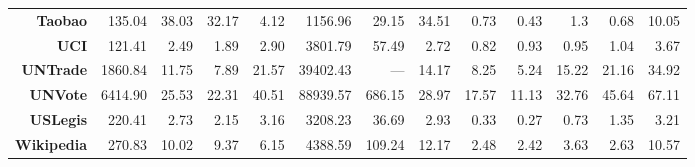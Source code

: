 {\begin{tabular}{@{}r|rrrrrrr|rrrrr@{}}
\textbf{Taobao}                       & 135.04                            & 38.03                              & 32.17                              & 4.12                             & 1156.96                             & 29.15                             & 34.51                             & 0.73                            & 0.43                            & 1.3                             & 0.68                            & 10.05                                    \\
\textbf{UCI}                          & 121.41                            & 2.49                               & 1.89                               & 2.90                             & 3801.79                             & 57.49                             & 2.72                              & 0.82                            & 0.93                            & 0.95                            & 1.04                            & 3.67                                     \\
\textbf{UNTrade}                      & 1860.84                           & 11.75                              & 7.89                               & 21.57                            & 39402.43                            & ---                               & 14.17                             & 8.25                            & 5.24                            & 15.22                           & 21.16                           & 34.92                                    \\
\textbf{UNVote}                       & 6414.90                           & 25.53                              & 22.31                              & 40.51                            & 88939.57                            & 686.15                            & 28.97                             & 17.57                           & 11.13                           & 32.76                           & 45.64                           & 67.11                                    \\
\textbf{USLegis}                      & 220.41                            & 2.73                               & 2.15                               & 3.16                             & 3208.23                             & 36.69                             & 2.93                              & 0.33                            & 0.27                            & 0.73                            & 1.35                            & 3.21                                     \\
\textbf{Wikipedia}                    & 270.83                            & 10.02                              & 9.37                               & 6.15                             & 4388.59                             & 109.24                            & 12.17                             & 2.48                            & 2.42                            & 3.63                            & 2.63                            & 10.57                                    \\ \bottomrule
\end{tabular}%
}